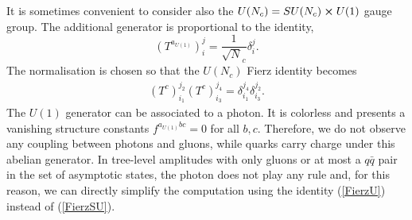 It is sometimes convenient to consider also the $U(N_c)=SU(N_c)\cross U(1)$ gauge group. The additional generator is proportional to the identity,
$$
	(T^{a_{U(1)}})_i^j=\frac{1}{\sqrt N_c} \delta_i^j.
$$
The normalisation is chosen so that the $U(N_c)$ Fierz identity becomes
\begin{align}
	(T^c)_{i_1}^{j_2} (T^c)_{i_3}^{j_4}=\delta_{i_1}^{j_4}\delta_{i_3}^{j_2}.	\label{FierzU}
\end{align}
The $U(1)$ generator can be associated to a photon. It is colorless and presents a vanishing structure constants $f^{a_{U(1)}bc}=0$ for all $b,c$. Therefore, we do not observe any coupling between photons and gluons, while quarks carry charge under this abelian generator. In tree-level amplitudes with only gluons or at most a $q\bar q$ pair in the set of asymptotic states, the photon does not play any rule and, for this reason, we can directly simplify the computation using the identity (\ref{FierzU}) instead of (\ref{FierzSU}).\\
